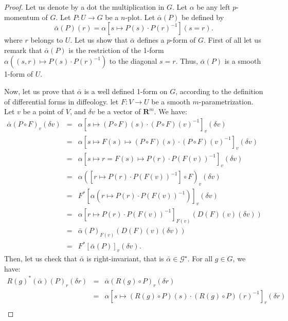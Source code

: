 \documentclass[10pt,reqno,twoside]{amsart}
\newcommand{\RR}{\mathbf{R}}
\newcommand{\cG}{\mathcal{G}}
\newcommand{\R}{R}
\newcommand{\D}{D}
\theoremstyle{plain}
\theoremstyle{definition}
\begin{document}
  \begin{proof}
    Let us denote by a dot the multiplication in $G$.
    Let $\alpha$ be any left $p$-momentum of $G$.
    Let $P : U \to G$ be a $n$-plot.
    Let $\bar \alpha(P)$ be defined by
    $$ \bar \alpha(P)(r) = \alpha\left[s \mapsto P (s) \cdot P (r)^{-1}\right](s=r).
      $$
    where $r$ belongs to $U$.
    Let us show that $\bar{\alpha}$ defines a $p$-form of $G$.
    First of all let us remark that $\bar \alpha(P)$ is the restriction of the 1-form $\alpha((s,r) \mapsto P (s)\cdot P (r)^{-1})$ to the diagonal $s=r$.
    Thus,
    $\bar \alpha(P)$ is a smooth 1-form of $U$.
    
    Now,
    let us prove that $\bar\alpha$ is a well defined 1-form on $G$,
    according to the definition of differential forms in diffeology.
    let $F : V \to U$ be a smooth $m$-parametrization.
    Let $v$ be a point of $V$,
    and $\delta v$ be a vector of $\RR^m$.
    We have:
    \begin{eqnarray*}
      \bar{\alpha}(P \circ F)_v(\delta v)
      & = & \alpha\left[s \mapsto (P \circ F)(s) \cdot (P \circ F)(v)^{-1}\right]_v(\delta v) \\
      & = & \alpha\left[s \mapsto F(s) \mapsto (P \circ F)(s) \cdot (P \circ F)(v)^{-1}\right]_v(\delta v) \\
      & = & \alpha\left[s \mapsto r = F(s) \mapsto P (r) \cdot P (F(v))^{-1}\right]_v(\delta v) \\
      & = & \alpha\left(\left[r \mapsto P (r) \cdot P (F(v))^{-1}\right] \circ F\right)_v(\delta v) \\
      & = & {F}^*\left[\alpha\left(r \mapsto P (r) \cdot P (F(v))^{-1}\right)\right]_v(\delta v) \\
      & = & \alpha\left[r \mapsto P (r) \cdot P (F(v))^{-1}\right]_{F(v)} (\D(F)(v)(\delta v)) \\
      & = & \bar{\alpha}(P)_{F(v)}(\D(F)(v)(\delta v)) \\
      & = & {F}^*\left[\bar \alpha(P)\right]_v(\delta v).
    \end{eqnarray*}
    Then,
    let us check that $\bar{\alpha}$ is right-invariant,
    that is $\bar \alpha \in \cG^\star$.
    For all $g \in G$,
    we have:
    \begin{eqnarray*}
      \R(g)^*(\bar\alpha)(P)_r(\delta r)
      & = & \bar\alpha(\R(g) \circ P)_r(\delta r) \\
      & = & \alpha\left[s \mapsto (\R(g) \circ P)(s) \cdot (\R(g) \circ P)(r)^{-1}\right]_r(\delta r) \\

\end{eqnarray*}
\end{proof}
\end{document}
